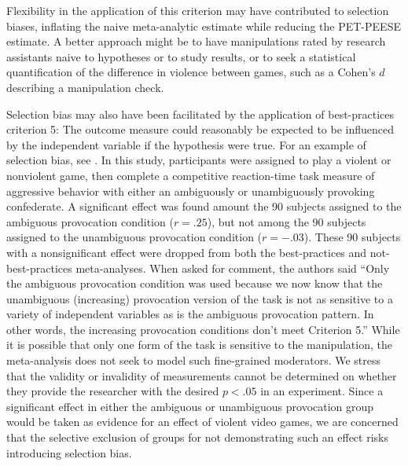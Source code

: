 \documentclass[man]{apa6}
\begin{document}
Flexibility in the application of this criterion may have contributed to selection biases, inflating the naive meta-analytic estimate while reducing the PET-PEESE estimate. A better approach might be to have manipulations rated by research assistants naive to hypotheses or to study results, or to seek a statistical quantification of the difference in violence between games, such as a Cohen's $d$ describing a manipulation check.

Selection bias may also have been facilitated by the application of best-practices criterion 5: The outcome measure could reasonably be expected to be influenced by the independent variable if the hypothesis were true. For an example of selection bias, see \citet[study 2]{Anderson:etal:2004}. In this study, participants were assigned to play a violent or nonviolent game, then complete a competitive reaction-time task measure of aggressive behavior with either an ambiguously or unambiguously provoking confederate. A significant effect was found amount the 90  subjects assigned to the ambiguous provocation condition ($r = .25$), but not among the 90 subjects assigned to the unambiguous provocation condition ($r = -.03$). These 90 subjects with a nonsignificant effect were dropped from both the best-practices and not-best-practices meta-analyses. When asked for comment, the authors said ``Only the ambiguous provocation condition was used because we now know that the unambiguous (increasing) provocation version of the task is not as sensitive to a variety of independent variables as is the ambiguous provocation pattern. In other words, the increasing provocation conditions don't meet Criterion 5.'' While it is possible that only one form of the task is sensitive to the manipulation, the meta-analysis does not seek to model such fine-grained moderators. We stress that the validity or invalidity of measurements cannot be determined on whether they provide the researcher with the desired $p<.05$ in an experiment. Since a significant effect in either the ambiguous or unambiguous provocation group would be taken as evidence for an effect of violent video games, we are concerned that the selective exclusion of groups for not demonstrating such an effect risks introducing selection bias.
\end{document}
